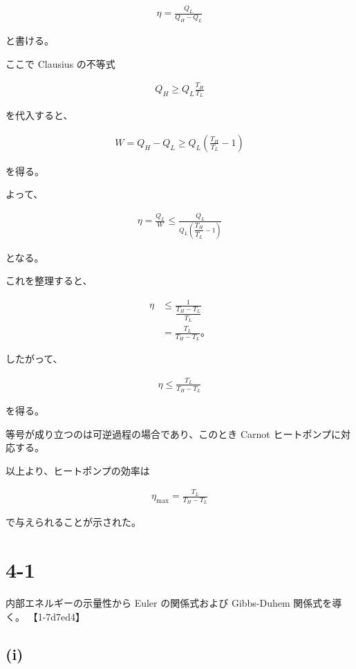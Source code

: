 \documentclass[platex,dvipdfmx,a4paper]{jsarticle}
\begin{document}
\begin{align*}
\eta
=
\frac{Q_L}{Q_H-Q_L}
\end{align*}

と書ける。

ここで Clausius の不等式

\begin{align*}
Q_H
\ge
Q_L\frac{T_H}{T_L}
\end{align*}

を代入すると、

\begin{align*}
W
=
Q_H-Q_L
\ge
Q_L
\left(
\frac{T_H}{T_L}-1
\right)
\end{align*}

を得る。

よって、

\begin{align*}
\eta
=
\frac{Q_L}{W}
\le
\frac{
Q_L
}{
Q_L
\left(
\dfrac{T_H}{T_L}-1
\right)
}
\end{align*}

となる。

これを整理すると、

\begin{align*}
\eta
&\le
\frac{1}{
\dfrac{T_H-T_L}{T_L}
}
\\
&=
\frac{T_L}{T_H-T_L}。
\end{align*}

したがって、

\begin{align*}
\eta
\le
\frac{T_L}{T_H-T_L}
\end{align*}

を得る。

等号が成り立つのは可逆過程の場合であり、このとき Carnot ヒートポンプに対応する。

以上より、ヒートポンプの効率は

\begin{align*}
\eta_{\max}
=
\frac{T_L}{T_H-T_L}
\end{align*}

で与えられることが示された。
\section{4-1}

内部エネルギーの示量性から Euler の関係式および Gibbs-Duhem 関係式を導く。 【1-7d7ed4】

\subsection{(i)}
\end{document}
